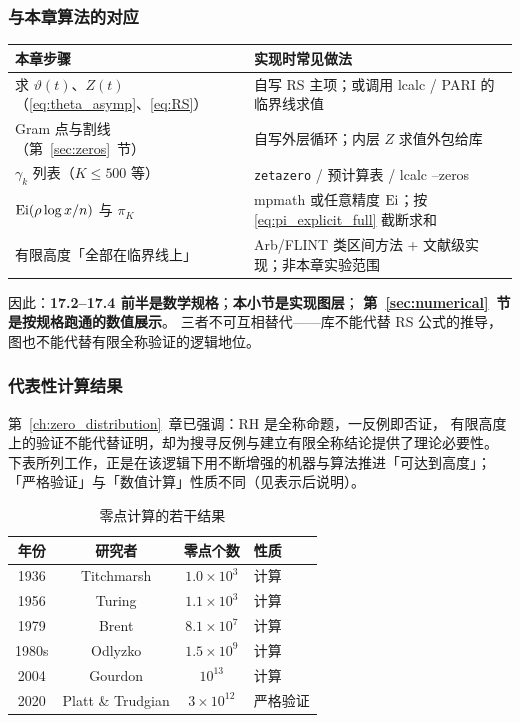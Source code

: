\subsubsection{与本章算法的对应}

\begin{center}
\renewcommand{\arraystretch}{1.3}
\begin{tabular}{@{}p{4.6cm}p{8.4cm}@{}}
\toprule
\textbf{本章步骤} & \textbf{实现时常见做法} \\
\midrule
求 $\vartheta(t)$、$Z(t)$（\eqref{eq:theta_asymp}、\eqref{eq:RS}）
  & 自写 RS 主项；或调用 lcalc / PARI 的临界线求值 \\
Gram 点与割线（第~\ref{sec:zeros}~节）
  & 自写外层循环；内层 $Z$ 求值外包给库 \\
$\gamma_k$ 列表（$K\le 500$ 等）
  & \texttt{zetazero} / 预计算表 / lcalc --zeros \\
$\operatorname{Ei}(\rho\log x/n)$ 与 $\pi_K$
  & mpmath 或任意精度 $\operatorname{Ei}$；按 \eqref{eq:pi_explicit_full} 截断求和 \\
有限高度「全部在临界线上」
  & Arb/FLINT 类区间方法 + 文献级实现；非本章实验范围 \\
\bottomrule
\end{tabular}
\end{center}

\noindent
因此：\textbf{17.2--17.4 前半是数学规格}；\textbf{本小节是实现图层}；
\textbf{第~\ref{sec:numerical}~节是按规格跑通的数值展示}。
三者不可互相替代——库不能代替 RS 公式的推导，图也不能代替有限全称验证的逻辑地位。

\subsubsection{代表性计算结果}

第~\ref{ch:zero_distribution}~章已强调：RH 是全称命题，一反例即否证，
有限高度上的验证不能代替证明，却为搜寻反例与建立有限全称结论提供了理论必要性。
下表所列工作，正是在该逻辑下用不断增强的机器与算法推进「可达到高度」；
「严格验证」与「数值计算」性质不同（见表示后说明）。

\begin{table}[htbp]
\centering
\caption{零点计算的若干结果}
\label{tab:milestones}
\begin{tabular}{@{}cccl@{}}
\toprule
年份 & 研究者 & 零点个数 & 性质 \\
\midrule
1936 & Titchmarsh & $1.0\times 10^3$ & 计算 \\
1956 & Turing & $1.1\times 10^3$ & 计算 \\
1979 & Brent & $8.1\times 10^7$ & 计算 \\
1980s & Odlyzko & $1.5\times 10^9$ & 计算 \\
2004 & Gourdon & $10^{13}$ & 计算 \\
2020 & Platt \& Trudgian & $3\times 10^{12}$ & 严格验证 \\
\bottomrule
\end{tabular}
\end{table}

